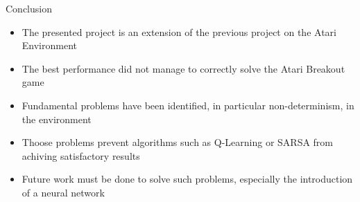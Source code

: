 \begin{frame}{Conclusion}
    \begin{itemize}
	\item The presented project is an extension of the previous project on the Atari Environment
	\item The best performance did not manage to correctly solve the Atari Breakout game
	\item Fundamental problems have been identified, in particular non-determinism, in the environment
	\item Thoose problems prevent algorithms such as Q-Learning or SARSA from achiving satisfactory results
	\item Future work must be done to solve such problems, especially the introduction of a neural network
    \end{itemize}
\end{frame}



